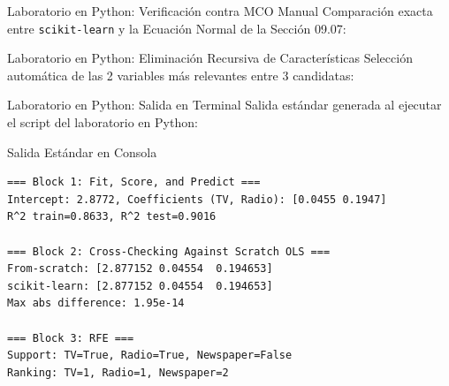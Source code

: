 \documentclass[10pt, aspectratio=169]{beamer}
\begin{document}
\begin{frame}[fragile]{Laboratorio en Python: Verificación contra MCO Manual}
  \scriptsize
  Comparación exacta entre \texttt{scikit-learn} y la Ecuación Normal de la Sección 09.07:
  {
  }
\end{frame}

\begin{frame}[fragile]{Laboratorio en Python: Eliminación Recursiva de Características}
  \scriptsize
  Selección automática de las 2 variables más relevantes entre 3 candidatas:
  {
  }
\end{frame}

\begin{frame}[fragile]{Laboratorio en Python: Salida en Terminal}
  \scriptsize
  Salida estándar generada al ejecutar el script del laboratorio en Python:
  \vspace{0.02cm}
  \begin{block}{Salida Estándar en Consola}
    \fontsize{3.4pt}{4.1pt}\selectfont
    \begin{verbatim}
=== Block 1: Fit, Score, and Predict ===
Intercept: 2.8772, Coefficients (TV, Radio): [0.0455 0.1947]
R^2 train=0.8633, R^2 test=0.9016

=== Block 2: Cross-Checking Against Scratch OLS ===
From-scratch: [2.877152 0.04554  0.194653]
scikit-learn: [2.877152 0.04554  0.194653]
Max abs difference: 1.95e-14

=== Block 3: RFE ===
Support: TV=True, Radio=True, Newspaper=False
Ranking: TV=1, Radio=1, Newspaper=2
    \end{verbatim}
  \end{block}
\end{frame}
\end{document}

